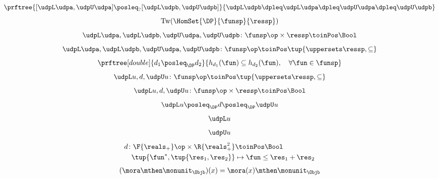 {\begin{forslides}
\begin{equation*}
\label{eq:order_udp_1}
\prftree{[\udpL\udpa,\udpU\udpa] \posleq_{?} [\udpL\udpb,\udpU\udpb]}{\udpL\udpb\dpleq\udpL\udpa\dpleq\udpU\udpa\dpleq\udpU\udpb}
\end{equation*}
\begin{equation*}
\label{eq:order_udp_2}
\text{Tw}(\HomSet{\DP}{\funsp}{\ressp})
\end{equation*}
\begin{equation*}
\label{eq:order_udp_3}
\udpL\udpa,\udpL\udpb,\udpU\udpa,\udpU\udpb\colon \funsp\op \times \ressp \toinPos \Bool
\end{equation*}
\begin{equation*}
\label{eq:order_udp_4}
\udpL\udpa,\udpL\udpb,\udpU\udpa,\udpU\udpb\colon \funsp\op \toinPos  \tup{\uppersets \ressp, \subseteq}
\end{equation*}
\begin{equation*}
\label{eq:upos_dp_def_4}
\prftree[double]{d_1\posleq_\DP d_2}{h_{d_1}(\fun)\subseteq h_{d_2}(\fun), \quad \forall \fun \in \funsp}
\end{equation*}
\begin{equation*}
\label{eq:order_udp_5}
\udpL u,d,\udpU u\colon \funsp\op \toinPos  \tup{\uppersets \ressp, \subseteq}
\end{equation*}
\begin{equation*}
\label{eq:order_udp_6}
\udpL u,d,\udpU u\colon  \funsp\op \times \ressp \toinPos \Bool
\end{equation*}
\begin{equation*}
\label{eq:order_udp_7}
\udpL u \posleq_\DP d \posleq_\DP \udpU u
\end{equation*}
\begin{equation*}
\label{eq:order_udp_8}
\udpL u
\end{equation*}
\begin{equation*}
\label{eq:order_udp_9}
\udpU u
\end{equation*}
\begin{equation*}
\label{eq:order_udp_10}
\begin{aligned}
d\colon \F{\reals_+}\op \times \R{\reals_+^2}&\toinPos \Bool\\
\tup{\fun^*,\tup{\res_1,\res_2}}&\mapsto \fun \leq \res_1+\res_2
\end{aligned}
\end{equation*}
\begin{equation*}
\label{eq:arrow_1}
\begin{aligned}
(\mora \mthen \monunit_\Objb)(x)&=\mora(x)\mthen \monunit_\Objb\\

\end{aligned}
\end{equation*}
\end{forslides}}
